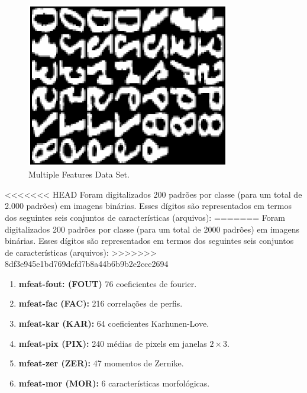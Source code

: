 \documentclass[12pt]{article}
\begin{document}
\begin{figure}[h]
\centering
\includegraphics[width=3.5in]{../out/data-base.eps}
\caption{Multiple Features Data Set.}
\label{fig:data_base}
\end{figure}  

<<<<<<< HEAD
Foram digitalizados 200 padrões por classe (para um total de 2.000 padrões) em imagens binárias. Esses dígitos são representados em termos dos seguintes seis conjuntos de características (arquivos):
=======
Foram digitalizados 200 padrões por classe (para um total de 2000 padrões) em imagens binárias. Esses dígitos são representados em termos dos seguintes seis conjuntos de características (arquivos):
>>>>>>> 8df3e945e1bd769dcfd7b8a44b6b9b2e2ccc2694

\begin{enumerate}
\item \textbf{mfeat-fout: (FOUT)} 76 coeficientes de fourier.
\item \textbf{mfeat-fac (FAC):} 216 correlações de perfis.
\item \textbf{mfeat-kar (KAR):} 64 coeficientes Karhunen-Love.
\item \textbf{mfeat-pix (PIX):} 240 médias de pixels em janelas $ 2 \times 3 $.
\item \textbf{mfeat-zer (ZER):} 47 momentos de Zernike.
\item \textbf{mfeat-mor (MOR):} 6 características morfológicas.
\end{enumerate}
\end{document}
